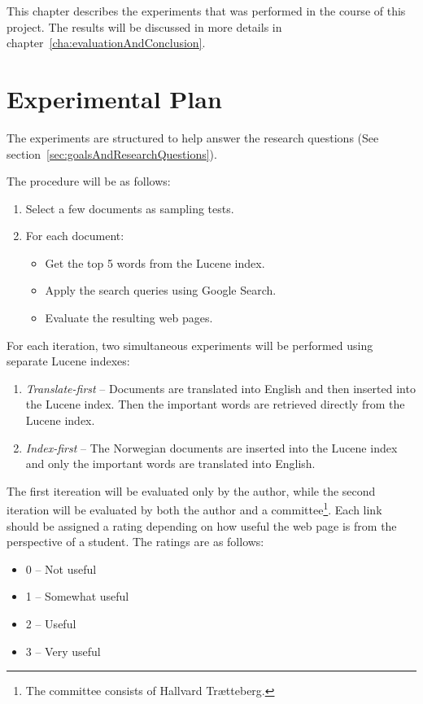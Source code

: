\documentclass[a4paper]{book}
\begin{document}
This chapter describes the experiments that was performed in the course of this project. The results will be discussed in more details in chapter~\ref{cha:evaluationAndConclusion}.

\section{Experimental Plan}
\label{sec:experimentalPlan}

The experiments are structured to help answer the research questions (See section~\ref{sec:goalsAndResearchQuestions}).

The procedure will be as follows:
\begin{enumerate}
\item Select a few documents as sampling tests.
\item For each document:
    \begin{itemize}
    \item Get the top 5 words from the Lucene index.
    \item Apply the search queries using Google Search.
    \item Evaluate the resulting web pages.
    \end{itemize}
\end{enumerate}

For each iteration, two simultaneous experiments will be performed using separate Lucene indexes:
\begin{enumerate}
\item \textit{Translate-first} -- Documents are translated into English and then inserted into the Lucene index. Then the important words are retrieved directly from the Lucene index.
\item \textit{Index-first} -- The Norwegian documents are inserted into the Lucene index and only the important words are translated into English.
\end{enumerate}

The first itereation will be evaluated only by the author, while the second iteration will be evaluated by both the author and a committee\footnote{The committee consists of Hallvard Trætteberg.}. Each link should be assigned a rating depending on how useful the web page is from the perspective of a student. The ratings are as follows:
\begin{itemize}
\item 0 -- Not useful
\item 1 -- Somewhat useful
\item 2 -- Useful
\item 3 -- Very useful
\end{itemize}
\end{document}
